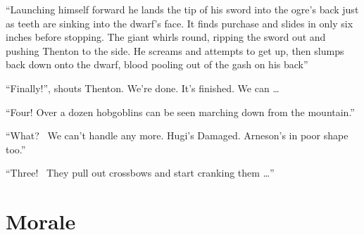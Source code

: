 \begin{multicols}{2}
{\begin{exampletext}
		``Launching himself forward he lands the tip of his sword into the ogre's back just as teeth are sinking into the dwarf's face. It finds purchase and slides in only six inches before stopping. The giant whirls \gls{round}, ripping the sword out and pushing Thenton to the side. He screams and attempts to get up, then slumps back down onto the dwarf, blood pooling out of the gash on his back''

``Finally!'', shouts Thenton. We're done. It's finished. We can {\dots}

``Four! Over a dozen hobgoblins can be seen marching down from the mountain.''

``What? \ We can't handle any more. Hugi's Damaged. Arneson's in poor shape too.''

``Three! \ They pull out crossbows and start cranking them {\dots}''
	\end{exampletext}}{}

\end{multicols}

\section{Morale}
\newcommand{\moralechart}{
	\begin{tcolorbox}[title={Morale Chart},arc=1mm,tabularx={cp{.75\textwidth}}]
		\gls{tn} & Situation \\\hline

		-4 & Monsters outnumber characters 3:1. \\

		-2 & Monsters outnumber characters 2:1. \\

		+2 & Characters outnumber the monsters. \\

		+2 & Monster is wounded. \\

		-2 & Character's top Strength Bonus is lower than the monster's.  \\

		+2 & Character's top Strength Bonus is higher than the monster's.  \\

		+1 & Players have displayed awesome magical abilities. \\

	\end{tcolorbox}
}

